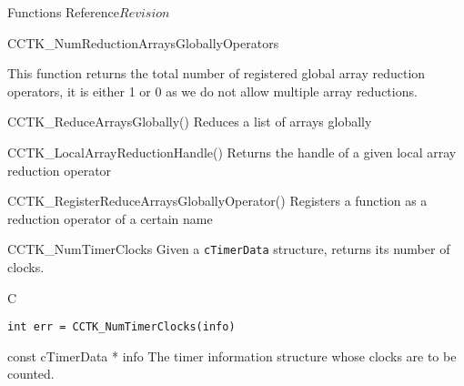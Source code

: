 \begin{cactuspart}{ Functions Reference}{}{$Revision$}
\begin{FunctionDescription}{CCTK\_NumReductionArraysGloballyOperators}

\begin{Discussion}
This function returns the total number of registered global array
reduction operators, it is either 1 or 0 as we do not allow multiple
array reductions.
\end{Discussion}

\begin{SeeAlsoSection}
\begin{SeeAlso}{CCTK\_ReduceArraysGlobally()}
Reduces a list of arrays globally
\end{SeeAlso}

\begin{SeeAlso}{CCTK\_LocalArrayReductionHandle()}
Returns the handle of a given local array reduction operator
\end{SeeAlso}

\begin{SeeAlso}{CCTK\_RegisterReduceArraysGloballyOperator()}
Registers a function as a reduction operator of a certain name
\end{SeeAlso}

\end{SeeAlsoSection}
\end{FunctionDescription}


\begin{FunctionDescription}{CCTK\_NumTimerClocks}
\label{CCTK-NumTimerClocks}
Given a {\tt cTimerData} structure, returns its number of clocks.
\begin{SynopsisSection}
\begin{Synopsis}{C}
\begin{verbatim}
int err = CCTK_NumTimerClocks(info)
\end{verbatim}
\end{Synopsis}
\end{SynopsisSection}

\begin{ParameterSection}
\begin{Parameter} {const cTimerData * info}
The timer information structure whose clocks are to be counted.
\end{Parameter}
\end{ParameterSection}
\end{FunctionDescription}



\end{cactuspart}
